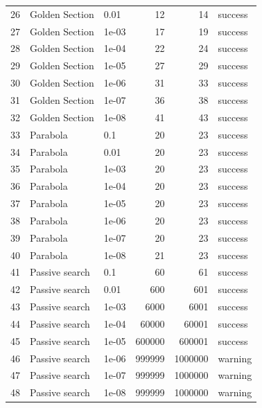 \begin{longtable}{rllrrl}
26 & Golden Section & 0.01 & 12 & 14 & success \\
27 & Golden Section & 1e-03 & 17 & 19 & success \\
28 & Golden Section & 1e-04 & 22 & 24 & success \\
29 & Golden Section & 1e-05 & 27 & 29 & success \\
30 & Golden Section & 1e-06 & 31 & 33 & success \\
31 & Golden Section & 1e-07 & 36 & 38 & success \\
32 & Golden Section & 1e-08 & 41 & 43 & success \\
33 & Parabola & 0.1 & 20 & 23 & success \\
34 & Parabola & 0.01 & 20 & 23 & success \\
35 & Parabola & 1e-03 & 20 & 23 & success \\
36 & Parabola & 1e-04 & 20 & 23 & success \\
37 & Parabola & 1e-05 & 20 & 23 & success \\
38 & Parabola & 1e-06 & 20 & 23 & success \\
39 & Parabola & 1e-07 & 20 & 23 & success \\
40 & Parabola & 1e-08 & 21 & 23 & success \\
41 & Passive search & 0.1 & 60 & 61 & success \\
42 & Passive search & 0.01 & 600 & 601 & success \\
43 & Passive search & 1e-03 & 6000 & 6001 & success \\
44 & Passive search & 1e-04 & 60000 & 60001 & success \\
45 & Passive search & 1e-05 & 600000 & 600001 & success \\
46 & Passive search & 1e-06 & 999999 & 1000000 & warning \\
47 & Passive search & 1e-07 & 999999 & 1000000 & warning \\
48 & Passive search & 1e-08 & 999999 & 1000000 & warning \\
\end{longtable}
